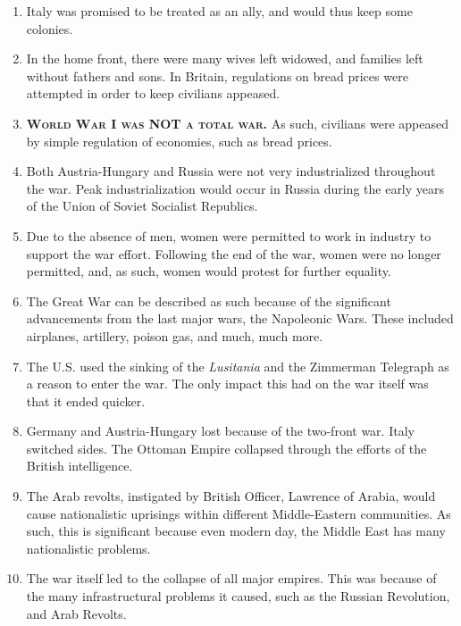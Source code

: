 \documentclass[12pt]{article}
\begin{document}
\begin{enumerate}
\item Italy was promised to be treated as an ally, and would thus keep some colonies.

\item In the home front, there were many wives left widowed, and families left without fathers and sons. In Britain, regulations on bread prices were attempted in order to keep civilians appeased.

\item \textbf{\textsc{World War I was NOT a total war.}} As such, civilians were appeased by simple regulation of economies, such as bread prices.

\item Both Austria-Hungary and Russia were not very industrialized throughout the war. Peak industrialization would occur in Russia during the early years of the Union of Soviet Socialist Republics.

\item Due to the absence of men, women were permitted to work in industry to support the war effort. Following the end of the war, women were no longer permitted, and, as such, women would protest for further equality.

\item The Great War can be described as such because of the significant advancements from the last major wars, the Napoleonic Wars. These included airplanes, artillery, poison gas, and much, much more.

\item The U.S. used the sinking of the \emph{Lusitania} and the Zimmerman Telegraph as a reason to enter the war. The only impact this had on the war itself was that it ended quicker.

\item Germany and Austria-Hungary lost because of the two-front war. Italy switched sides. The Ottoman Empire collapsed through the efforts of the British intelligence.

\item The Arab revolts, instigated by British Officer, Lawrence of Arabia, would cause nationalistic uprisings within different Middle-Eastern communities. As such, this is significant because even modern day, the Middle East has many nationalistic problems.

\item The war itself led to the collapse of all major empires. This was because of the many infrastructural problems it caused, such as the Russian Revolution, and Arab Revolts.


\end{enumerate}
\end{document}

